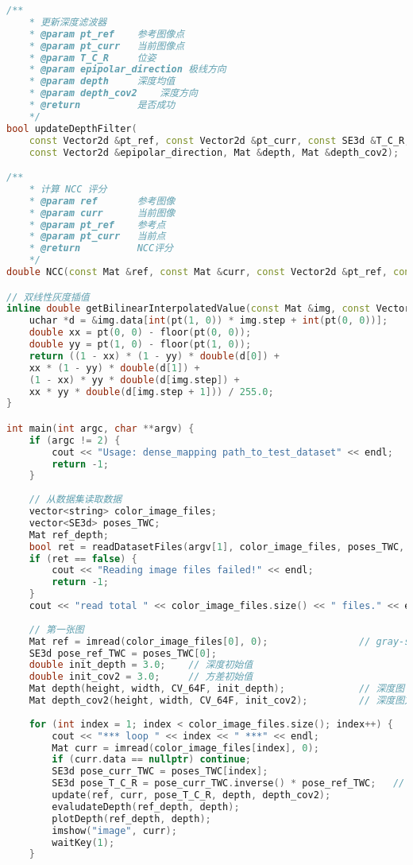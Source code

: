 \begin{lstlisting}[language=c++,caption=slambook2/ch12/dense\_monocular/dense\_mapping.cpp（片段）]
/**
    * 更新深度滤波器
    * @param pt_ref    参考图像点
    * @param pt_curr   当前图像点
    * @param T_C_R     位姿
    * @param epipolar_direction 极线方向
    * @param depth     深度均值
    * @param depth_cov2    深度方向
    * @return          是否成功
    */
bool updateDepthFilter(
    const Vector2d &pt_ref, const Vector2d &pt_curr, const SE3d &T_C_R,
    const Vector2d &epipolar_direction, Mat &depth, Mat &depth_cov2);

/**
    * 计算 NCC 评分
    * @param ref       参考图像
    * @param curr      当前图像
    * @param pt_ref    参考点
    * @param pt_curr   当前点
    * @return          NCC评分
    */
double NCC(const Mat &ref, const Mat &curr, const Vector2d &pt_ref, const Vector2d &pt_curr);

// 双线性灰度插值
inline double getBilinearInterpolatedValue(const Mat &img, const Vector2d &pt) {
    uchar *d = &img.data[int(pt(1, 0)) * img.step + int(pt(0, 0))];
    double xx = pt(0, 0) - floor(pt(0, 0));
    double yy = pt(1, 0) - floor(pt(1, 0));
    return ((1 - xx) * (1 - yy) * double(d[0]) +
    xx * (1 - yy) * double(d[1]) +
    (1 - xx) * yy * double(d[img.step]) +
    xx * yy * double(d[img.step + 1])) / 255.0;
}

int main(int argc, char **argv) {
    if (argc != 2) {
        cout << "Usage: dense_mapping path_to_test_dataset" << endl;
        return -1;
    }
    
    // 从数据集读取数据
    vector<string> color_image_files;
    vector<SE3d> poses_TWC;
    Mat ref_depth;
    bool ret = readDatasetFiles(argv[1], color_image_files, poses_TWC, ref_depth);
    if (ret == false) {
        cout << "Reading image files failed!" << endl;
        return -1;
    }
    cout << "read total " << color_image_files.size() << " files." << endl;
    
    // 第一张图
    Mat ref = imread(color_image_files[0], 0);                // gray-scale image
    SE3d pose_ref_TWC = poses_TWC[0];
    double init_depth = 3.0;    // 深度初始值
    double init_cov2 = 3.0;     // 方差初始值
    Mat depth(height, width, CV_64F, init_depth);             // 深度图
    Mat depth_cov2(height, width, CV_64F, init_cov2);         // 深度图方差
    
    for (int index = 1; index < color_image_files.size(); index++) {
        cout << "*** loop " << index << " ***" << endl;
        Mat curr = imread(color_image_files[index], 0);
        if (curr.data == nullptr) continue;
        SE3d pose_curr_TWC = poses_TWC[index];
        SE3d pose_T_C_R = pose_curr_TWC.inverse() * pose_ref_TWC;   // T_C_W * T_W_R = T_C_R
        update(ref, curr, pose_T_C_R, depth, depth_cov2);
        evaludateDepth(ref_depth, depth);
        plotDepth(ref_depth, depth);
        imshow("image", curr);
        waitKey(1);
    }
    

\end{lstlisting}
